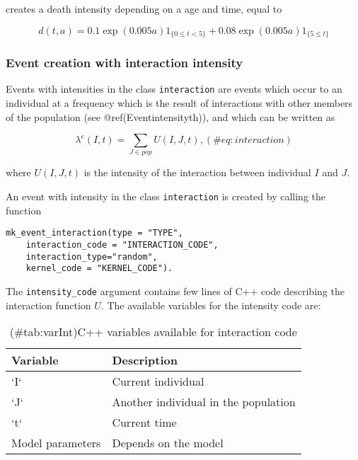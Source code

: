 creates a death intensity depending on a age and time, equal to

\begin{equation*}
d(t,a) = 0.1\exp(0.005a) 1_{\{0\leq t <5\}} + 0.08\exp(0.005a) 1_{\{5\leq t\}} 
\end{equation*}

\hypertarget{event-creation-with-interaction-intensity}{%
\subsubsection{Event creation with interaction intensity}\label{event-creation-with-interaction-intensity}}

Events with intensities in the class \texttt{interaction} are events which occur to an individual at a frequency which is the result of interactions with other members of the population (see @ref(Eventintensityth)), and which can be written as

\begin{equation*}
\lambda^e(I,t) = \sum_{J \in pop} U(I,J,t),
  (\#eq:interaction)
\end{equation*}

where \(U(I,J,t)\) is the intensity of the interaction between individual \(I\) and \(J\).

An event with intensity in the class \texttt{interaction} is created by calling the function

\begin{verbatim}
mk_event_interaction(type = "TYPE",  
    interaction_code = "INTERACTION_CODE",  
    interaction_type="random",
    kernel_code = "KERNEL_CODE").
\end{verbatim}

The \texttt{intensity\_code} argument contains few lines of C++ code describing
the interaction function \(U\). The available variables for the intensity code are:

\begin{table}

\caption{(\#tab:varInt)C++ variables available for interaction code}
\centering
\begin{tabular}[t]{l|l}
\hline
Variable & Description\\
\hline
`I` & Current individual\\
\hline
`J` & Another individual in the population\\
\hline
`t` & Current time\\
\hline
Model parameters & Depends on the model\\
\hline
\end{tabular}
\end{table}

